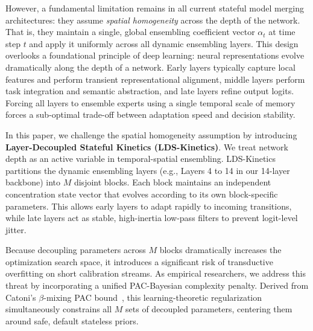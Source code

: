 However, a fundamental limitation remains in all current stateful model merging architectures: they assume \emph{spatial homogeneity} across the depth of the network. That is, they maintain a single, global ensembling coefficient vector $\alpha_t$ at time step $t$ and apply it uniformly across all dynamic ensembling layers. This design overlooks a foundational principle of deep learning: neural representations evolve dramatically along the depth of a network. Early layers typically capture local features and perform transient representational alignment, middle layers perform task integration and semantic abstraction, and late layers refine output logits. Forcing all layers to ensemble experts using a single temporal scale of memory forces a sub-optimal trade-off between adaptation speed and decision stability.

In this paper, we challenge the spatial homogeneity assumption by introducing \textbf{Layer-Decoupled Stateful Kinetics (LDS-Kinetics)}. We treat network depth as an active variable in temporal-spatial ensembling. LDS-Kinetics partitions the dynamic ensembling layers (e.g., Layers 4 to 14 in our 14-layer backbone) into $M$ disjoint blocks. Each block maintains an independent concentration state vector that evolves according to its own block-specific parameters. This allows early layers to adapt rapidly to incoming transitions, while late layers act as stable, high-inertia low-pass filters to prevent logit-level jitter. 

Because decoupling parameters across $M$ blocks dramatically increases the optimization search space, it introduces a significant risk of transductive overfitting on short calibration streams. As empirical researchers, we address this threat by incorporating a unified PAC-Bayesian complexity penalty. Derived from Catoni’s $\beta$-mixing PAC bound~\cite{catoni2007}, this learning-theoretic regularization simultaneously constrains all $M$ sets of decoupled parameters, centering them around safe, default stateless priors.

